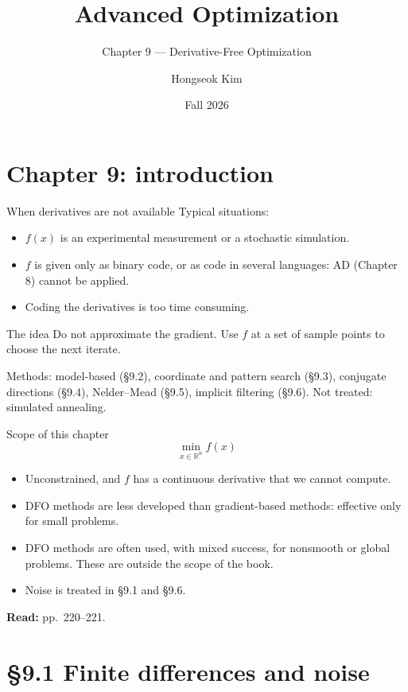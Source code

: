 \documentclass[12pt,aspectratio=169]{beamer}
\title{Advanced Optimization}
\subtitle{Chapter 9 --- Derivative-Free Optimization}
\author{Hongseok Kim}
\institute{Department of Electronic Engineering, Sogang University}
\date{Fall 2026}
\newcommand{\readpp}[1]{{\color{red!80!black}\textbf{Read:} #1}}
\newcommand{\R}{\mathbb{R}}
\begin{document}
\section{Chapter 9: introduction}

\begin{frame}
  \titlepage
\end{frame}

\begin{frame}{When derivatives are not available}
  Typical situations:
  \begin{itemize}
    \item $f(x)$ is an experimental measurement or a stochastic simulation.
    \item $f$ is given only as binary code, or as code in several languages: AD (Chapter 8) cannot be applied.
    \item Coding the derivatives is too time consuming.
  \end{itemize}
  \begin{block}{The idea}
    Do not approximate the gradient. Use $f$ at a set of \alert{sample points} to choose the next iterate.
  \end{block}
  Methods: model-based (\S9.2), coordinate and pattern search (\S9.3), conjugate directions (\S9.4),
  Nelder--Mead (\S9.5), implicit filtering (\S9.6). Not treated: simulated annealing.
\end{frame}

\begin{frame}{Scope of this chapter}
  \begin{equation}
    \min_{x\in\R^n} f(x) \tag{9.1}
  \end{equation}
  \begin{itemize}
    \item Unconstrained, and $f$ has a continuous derivative that we cannot compute.
    \item DFO methods are less developed than gradient-based methods:
      \alert{effective only for small problems}.
    \item DFO methods are often used, with mixed success, for nonsmooth or global problems.
      These are outside the scope of the book.
    \item Noise is treated in \S9.1 and \S9.6.
  \end{itemize}
  \readpp{pp.~220--221.}
\end{frame}

\section{\S9.1 Finite differences and noise}
\end{document}
